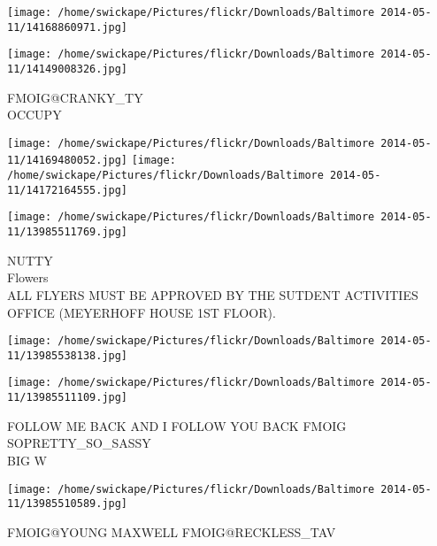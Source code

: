 \documentclass[10pt,letterpaper]{article}
\begin{document}
\texttt{[image: /home/swickape/Pictures/flickr/Downloads/Baltimore 2014-05-11/14168860971.jpg]}

\vspace{0.25in}
\texttt{[image: /home/swickape/Pictures/flickr/Downloads/Baltimore 2014-05-11/14149008326.jpg]}

FMOIG@CRANKY\_TY\\
OCCUPY\\
\pagebreak

\texttt{[image: /home/swickape/Pictures/flickr/Downloads/Baltimore 2014-05-11/14169480052.jpg]}
\texttt{[image: /home/swickape/Pictures/flickr/Downloads/Baltimore 2014-05-11/14172164555.jpg]}

\texttt{[image: /home/swickape/Pictures/flickr/Downloads/Baltimore 2014-05-11/13985511769.jpg]}

NUTTY\\
Flowers\\
ALL FLYERS MUST BE APPROVED BY THE SUTDENT ACTIVITIES OFFICE (MEYERHOFF HOUSE 1ST FLOOR).\\
\pagebreak

\texttt{[image: /home/swickape/Pictures/flickr/Downloads/Baltimore 2014-05-11/13985538138.jpg]}

\vspace{0.25in}
\texttt{[image: /home/swickape/Pictures/flickr/Downloads/Baltimore 2014-05-11/13985511109.jpg]}

FOLLOW ME BACK AND I FOLLOW YOU BACK FMOIG SOPRETTY\_SO\_SASSY\\
BIG W\\
\pagebreak

\texttt{[image: /home/swickape/Pictures/flickr/Downloads/Baltimore 2014-05-11/13985510589.jpg]}

FMOIG@YOUNG MAXWELL FMOIG@RECKLESS\_TAV\\
\pagebreak
\end{document}
